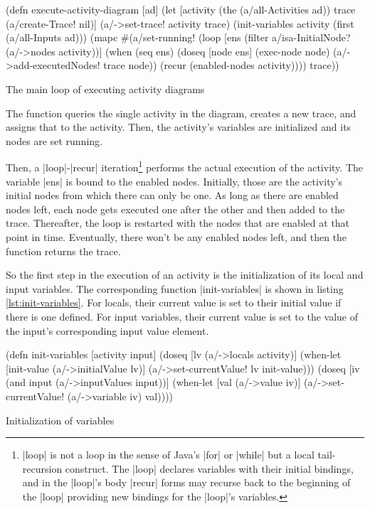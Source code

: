 \documentclass[submission]{eptcs}
\newcommand{\code}{\clojureinline}
\begin{document}
\begin{listing}[h!tb]
\begin{clojurecode}
(defn execute-activity-diagram [ad]
  (let [activity (the (a/all-Activities ad))
        trace (a/create-Trace! nil)]
    (a/->set-trace! activity trace)
    (init-variables activity (first (a/all-Inputs ad)))
    (mapc #(a/set-running! %
    (loop [ens (filter a/isa-InitialNode? (a/->nodes activity))]
      (when (seq ens)
        (doseq [node ens]
          (exec-node node)
          (a/->add-executedNodes! trace node))
        (recur (enabled-nodes activity))))
    trace))
\end{clojurecode}
\caption{The main loop of executing activity diagrams}
\label{lst:execute-activity-diagram}
\end{listing}

The function queries the single activity in the diagram, creates a new trace,
and assigns that to the activity.  Then, the activity's variables are
initialized and its nodes are set running.

Then, a \code|loop|-\code|recur| iteration\footnote{\code|loop| is not a loop
  in the sense of Java's \code|for| or \code|while| but a local tail-recursion
  construct.  The \code|loop| declares variables with their initial bindings,
  and in the \code|loop|'s body \code|recur| forms may recurse back to the
  beginning of the \code|loop| providing new bindings for the \code|loop|'s
  variables.} performs the actual execution of the activity.  The variable
\code|ens| is bound to the enabled nodes.  Initially, those are the activity's
initial nodes from which there can only be one.  As long as there are enabled
nodes left, each node gets executed one after the other and then added to the
trace.  Thereafter, the loop is restarted with the nodes that are enabled at
that point in time.  Eventually, there won't be any enabled nodes left, and
then the function returns the trace.

So the first step in the execution of an activity is the initialization of its
local and input variables.  The corresponding function \code|init-variables| is
shown in listing \vref{lst:init-variables}.  For locals, their current value is
set to their initial value if there is one defined.  For input variables, their
current value is set to the value of the input's corresponding input value
element.

\begin{listing}[h!tb]
\begin{clojurecode}
(defn init-variables [activity input]
  (doseq [lv (a/->locals activity)]
    (when-let [init-value (a/->initialValue lv)]
      (a/->set-currentValue! lv init-value)))
  (doseq [iv (and input (a/->inputValues input))]
    (when-let [val (a/->value iv)]
      (a/->set-currentValue! (a/->variable iv) val))))
\end{clojurecode}
\caption{Initialization of variables}
\label{lst:init-variables}
\end{listing}
\end{document}
